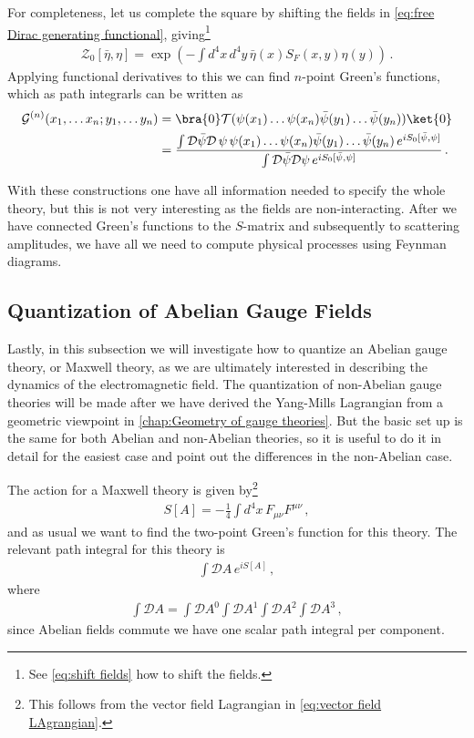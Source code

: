 For completeness, let us complete the square by shifting the fields in \cref{eq:free Dirac generating functional}, giving\footnote{See \cref{eq:shift fields} how to shift the fields.}
\begin{align}
    \mathcal{Z}_{0}[\bar{\eta},\eta]=\exp(-\int d^{4}x\,d^{4}y\,\bar{\eta}(x)S_{F}(x,y)\eta(y))\,.
\end{align}
Applying functional derivatives to this we can find $n$-point Green's functions, which as path integrarls can be written as
\begin{align}
    \mathcal{G}^{(n)}(x_1,\dots x_n;y_1,\dots y_n)&=\bra{0}\mathcal{T}(\psi(x_1)\dots\psi(x_n)\bar{\psi}(y_1)\dots\bar{\psi}(y_n))\ket{0}\nonumber
    \\
    &=\frac{\int\mathcal{D}\bar{\psi}\mathcal{D}\,\psi\,\psi(x_1)\dots\psi(x_n)\bar{\psi}(y_1)\dots\bar{\psi}(y_n)\,e^{iS_{0}[\bar{\psi},\psi]}}{\int\mathcal{D}\bar{\psi}\mathcal{D}\psi\,e^{iS_{0}[\bar{\psi},\psi]}}\,.
\end{align}

With these constructions one have all information needed to specify the whole theory, but this is not very interesting as the fields are non-interacting.
After we have connected Green's functions to the $S$-matrix and subsequently to scattering amplitudes, we have all we need to compute physical processes using Feynman diagrams. 



\subsection{Quantization of Abelian Gauge Fields}\label{sec:quantization of abelian}
Lastly, in this subsection we will investigate how to quantize an Abelian gauge theory, or Maxwell theory, as we are ultimately interested in describing the dynamics of the electromagnetic field. The quantization of non-Abelian gauge theories will be made after we have derived the Yang-Mills Lagrangian from a geometric viewpoint in \cref{chap:Geometry of gauge theories}. But the basic set up is the same for both Abelian and non-Abelian theories, so it is useful to do it in detail for the easiest case and point out the differences in the non-Abelian case.

The action for a Maxwell theory is given by\footnote{This follows from the vector field Lagrangian in \cref{eq:vector field LAgrangian}.}
\begin{align}
    S[A]=-\frac{1}{4}\int d^{4}x\,F_{\mu\nu}F^{\mu\nu}\,,
\end{align}
and as usual we want to find the two-point Green's function for this theory. The relevant path integral for this theory is
\begin{align}\label{eq:Maxwell path integral}
    \int\mathcal{D}A\,e^{iS[A]}\,,
\end{align}
where 
\begin{align}
    \int\mathcal{D}A=\int\mathcal{D}A^{0}\int\mathcal{D}A^{1}\int\mathcal{D}A^{2}\int\mathcal{D}A^{3}\,,
\end{align}
since Abelian fields commute we have one scalar path integral per component.  

